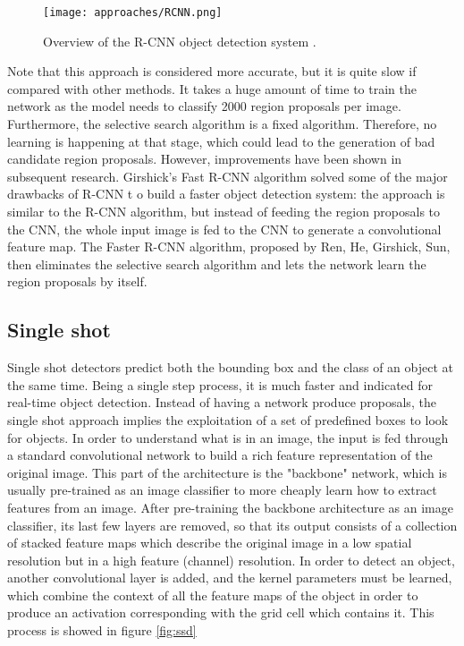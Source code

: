 \begin{figure}[h]
	\caption{Overview of the R-CNN object detection system \cite{Gandhi2018}.}
	\centering
	\texttt{[image: approaches/RCNN.png]}
	\label{fig:rcnn}
\end{figure}

Note that this approach is considered more accurate, but it is quite slow if compared with other methods. It takes a huge amount of time to train the network as the model needs to classify 2000 region proposals per image. Furthermore, the selective search algorithm is a fixed algorithm. Therefore, no learning is happening at that stage, which could lead to the generation of bad candidate region proposals. However, improvements have been shown in subsequent research. Girshick’s Fast R-CNN algorithm solved some of the major drawbacks of R-CNN t	o build a faster object detection system: the approach is similar to the R-CNN algorithm, but instead of feeding the region proposals to the CNN, the whole input image is fed to the CNN to generate a convolutional feature map. The Faster R-CNN algorithm, proposed by Ren, He, Girshick, Sun, then eliminates the selective search algorithm and lets the network learn the region proposals by itself.

\subsection{Single shot}
\label{ssec:singleshot}

Single shot detectors predict both the bounding box and the class of an object at the same time. Being a single step process, it is much faster and indicated for real-time object detection. Instead of having a network produce proposals, the single shot approach implies the exploitation of a set of predefined boxes to look for objects. In order to understand what is in an image, the input is fed through a standard convolutional network to build a rich feature representation of the original image. This part of the architecture is the "backbone" network, which is usually pre-trained as an image classifier to more cheaply learn how to extract features from an image. After pre-training the backbone architecture as an image classifier, its last few layers are removed, so that its output consists of a collection of stacked feature maps which describe the original image in a low spatial resolution but in a high feature (channel) resolution. In order to detect an object, another convolutional layer is added, and the kernel parameters must be learned, which combine the context of all the feature maps of the object in order to produce an activation corresponding with the grid cell which contains it. This process is showed in figure \ref{fig:ssd} 

